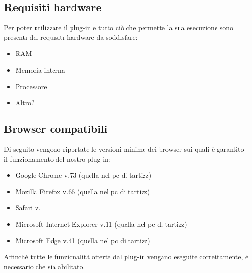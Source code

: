 \subsection{Requisiti hardware}
Per poter utilizzare il plug-in e tutto ciò che permette la sua esecuzione sono presenti dei requisiti hardware da soddisfare:
\begin{itemize}
	\item{RAM}
	\item{Memoria interna}
	\item{Processore}
	\item{Altro?} 
\end{itemize}
\subsection{Browser compatibili}
Di seguito vengono riportate le versioni minime dei browser sui quali è garantito il funzionamento del nostro plug-in:
\begin{itemize}
	\item{Google Chrome v.73 (quella nel pc di tartizz)}
	\item{Mozilla Firefox v.66 (quella nel pc di tartizz)}
	\item{Safari v.}
	\item{Microsoft Internet Explorer v.11 (quella nel pc di tartizz)}
	\item{Microsoft Edge v.41 (quella nel pc di tartizz)} \\
\end{itemize}

Affinché tutte le funzionalità offerte dal plug-in vengano eseguite correttamente, è necessario che  sia abilitato.
\pagebreak